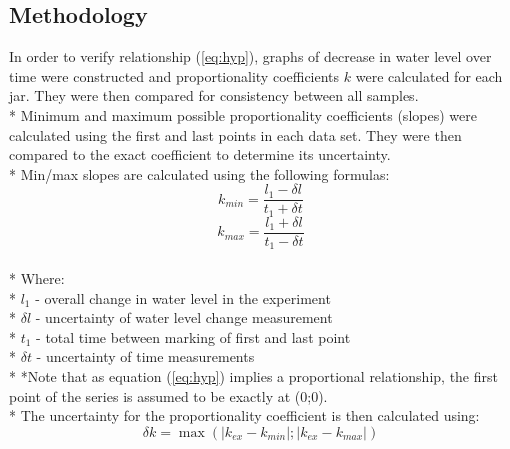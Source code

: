\documentclass[12pt,letterpaper,final]{report}
\begin{document}
\subsection{Methodology}
In order to verify relationship (\ref{eq:hyp}), graphs of decrease in water level over time were constructed and proportionality coefficients $k$ were calculated for each jar. They were then compared for consistency between all samples.
\medskip
\\* Minimum and maximum possible proportionality coefficients (slopes) were calculated using the first and last points in each data set. They were then compared to the exact coefficient to determine its uncertainty.
\medskip
\\* Min/max slopes are calculated using the following formulas:
\begin{equation}\label{eq:min}
k_{min} = \frac{l_{1}-\delta l}{t_{1}+ \delta t}
\end{equation}
\begin{equation}\label{eq:max}
k_{max} = \frac{l_{1}+\delta l}{t_{1}-\delta t}
\end{equation}
\medskip
\\* Where:
\\* $l_{1}$ - overall change in water level in the experiment 
\\* $\delta l$ - uncertainty of water level change measurement
\\* $t_{1}$ - total time between marking of first and last point
\\* $\delta t$ - uncertainty of time measurements
\medskip
\\* *Note that as equation (\ref{eq:hyp}) implies a proportional relationship, the first point of the series is assumed to be exactly at (0;0).
\medskip
\\* The uncertainty for the proportionality coefficient is then calculated using:
\medskip
\begin{equation} \label{eq:unc}
\delta k = \max \left ( \left| k_{ex} - k_{min}\right|; \left | k_{ex}-k_{max}\right| \right )
\end{equation}
\end{document}
